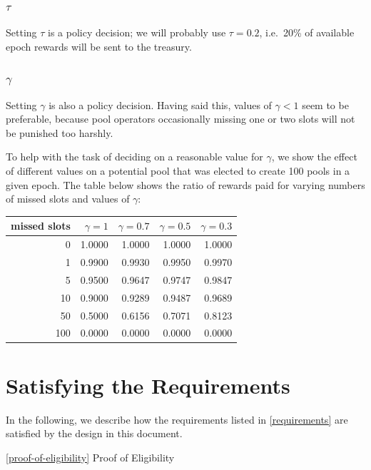 \documentclass[11pt,a4paper]{article}
\begin{document}
\subsubsection{\texorpdfstring{\(\tau\)}{\textbackslash{}tau}}\label{tau}

Setting \(\tau\) is a policy decision; we will probably use
\(\tau=0.2\), i.e.~20\% of available epoch rewards will be sent to the
treasury.

\subsubsection{\texorpdfstring{\(\gamma\)}{\textbackslash{}gamma}}\label{gamma}

Setting \(\gamma\) is also a policy decision. Having said this, values
of \(\gamma<1\) seem to be preferable, because pool operators
occasionally missing one or two slots will not be punished too harshly.

To help with the task of deciding on a reasonable value for \(\gamma\),
we show the effect of different values on a potential pool that was
elected to create 100 pools in a given epoch. The table below shows the
ratio of rewards paid for varying numbers of missed slots and values of
\(\gamma\):

\begin{tabular}[t]{rrrrr}
    missed slots & $\gamma=1$ & $\gamma=0.7$ & $\gamma=0.5$ & $\gamma=0.3$ \\
    \hline
      0 & 1.0000 & 1.0000 & 1.0000 & 1.0000 \\
      1 & 0.9900 & 0.9930 & 0.9950 & 0.9970 \\
      5 & 0.9500 & 0.9647 & 0.9747 & 0.9847 \\
     10 & 0.9000 & 0.9289 & 0.9487 & 0.9689 \\
     50 & 0.5000 & 0.6156 & 0.7071 & 0.8123 \\
    100 & 0.0000 & 0.0000 & 0.0000 & 0.0000 \\
\end{tabular}

\section{Satisfying the Requirements}\label{satisfying-the-requirements}

In the following, we describe how the requirements listed in
\ref{requirements} are satisfied by the design in this document.

\ref{proof-of-eligibility} Proof of Eligibility
\end{document}

